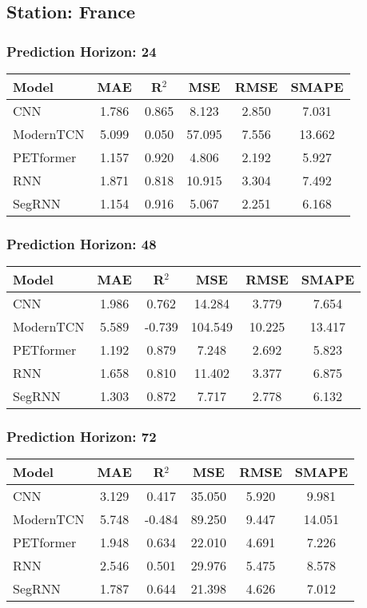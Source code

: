 \subsection*{Station: France}
\subsubsection*{Prediction Horizon: 24}
\begin{tabular}{lccccc}
\toprule
Model & MAE & R$^2$ & MSE & RMSE & SMAPE \\
\midrule
CNN & 1.786 & 0.865 & 8.123 & 2.850 & 7.031 \\
ModernTCN & 5.099 & 0.050 & 57.095 & 7.556 & 13.662 \\
PETformer & 1.157 & 0.920 & 4.806 & 2.192 & 5.927 \\
RNN & 1.871 & 0.818 & 10.915 & 3.304 & 7.492 \\
SegRNN & 1.154 & 0.916 & 5.067 & 2.251 & 6.168 \\
\bottomrule
\end{tabular}
\vspace{0.5cm}
\subsubsection*{Prediction Horizon: 48}
\begin{tabular}{lccccc}
\toprule
Model & MAE & R$^2$ & MSE & RMSE & SMAPE \\
\midrule
CNN & 1.986 & 0.762 & 14.284 & 3.779 & 7.654 \\
ModernTCN & 5.589 & -0.739 & 104.549 & 10.225 & 13.417 \\
PETformer & 1.192 & 0.879 & 7.248 & 2.692 & 5.823 \\
RNN & 1.658 & 0.810 & 11.402 & 3.377 & 6.875 \\
SegRNN & 1.303 & 0.872 & 7.717 & 2.778 & 6.132 \\
\bottomrule
\end{tabular}
\vspace{0.5cm}
\subsubsection*{Prediction Horizon: 72}
\begin{tabular}{lccccc}
\toprule
Model & MAE & R$^2$ & MSE & RMSE & SMAPE \\
\midrule
CNN & 3.129 & 0.417 & 35.050 & 5.920 & 9.981 \\
ModernTCN & 5.748 & -0.484 & 89.250 & 9.447 & 14.051 \\
PETformer & 1.948 & 0.634 & 22.010 & 4.691 & 7.226 \\
RNN & 2.546 & 0.501 & 29.976 & 5.475 & 8.578 \\
SegRNN & 1.787 & 0.644 & 21.398 & 4.626 & 7.012 \\
\bottomrule
\end{tabular}
\vspace{0.5cm}
